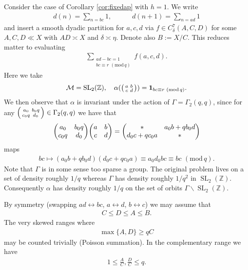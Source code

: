 \documentclass[12pt]{amsart}
\theoremstyle{definition}
\theoremstyle{remark}
\numberwithin{equation}{section}
\newcommand{\Z}{{\mathbb Z}}
\newcommand{\1}{{\mathbf 1}}
\newcommand{\SL}{\operatorname{SL}_2}
\renewcommand{\pmod}[1]{\,\,(\mathrm{mod}\,{#1})}
\begin{document}
Consider the case of  Corollary \ref{cor:fixedap} with $h=1$. We write
\begin{align*}
    d(n) = \sum_{n=bc} 1, \quad \quad \quad d(n+1) = \sum_{n=ad} 1
\end{align*}
 and insert a smooth dyadic partition for $a,c,d$ via $f \in C^{7}_{\delta}(A,C,D)$ for some $A,C,D \ll X$ with $AD \asymp X$ and $\delta \asymp \eta$. Denote also $B:= X/C$.  This reduces matter to evaluating 
\begin{align*}
    \sum_{\substack{ad-bc = 1 \\ bc \equiv r \pmod{q} }} f(a,c,d).
\end{align*} 
Here we take
\begin{align*}
    \mathcal{M} = \SL(\Z), \quad \alpha(\smqty(a & b \\ c& d)) = \mathbf{1}_{bc \equiv r \pmod{q}}.
\end{align*}
We then observe that $\alpha$ is invariant under the action of $\Gamma = \Gamma_2(q,q)$, since for any $ \smqty( a_0 & b_0 q \\  c_0 q & d_0) \in \Gamma_2(q,q)$ we have that
\begin{align*}
    \mqty( a_0 & b_0 q \\  c_0 q & d_0)  \mqty(a & b \\ c& d) = \mqty(\ast & a_0 b + q b_0 d \\ d_0 c + q c_0 a & \ast) 
\end{align*}
maps 
\begin{align*}
   bc \mapsto (a_0 b + q b_0 d) (d_0 c + q c_0 a) \equiv a_0 d_0 bc \equiv bc \pmod{q}.
\end{align*} 
Note that $\Gamma$ is in some sense too sparse a group. The original problem lives on a set of density roughly $1/q$ whereas $\Gamma$ has density roughly $1/q^2$ in $\SL(\Z)$. Consequently $\alpha$ has density roughly $1/q$ on the set of orbits $\Gamma \backslash \SL(\Z)$.

By symmetry (swapping $ad \leftrightarrow bc$, $a \leftrightarrow d$, $b \leftrightarrow c$) we may assume that 
\begin{align*}
    C \leq D \leq A \leq B.
\end{align*}
The very skewed ranges where
\begin{align*}
    \max \{ A,D \} \geq q C
\end{align*}
may be counted trivially (Poisson summation). In the complementary range we have
\begin{align}
     1\leq \frac{A}{C}, \frac{D}{C} \leq q.
\end{align}
\end{document}
